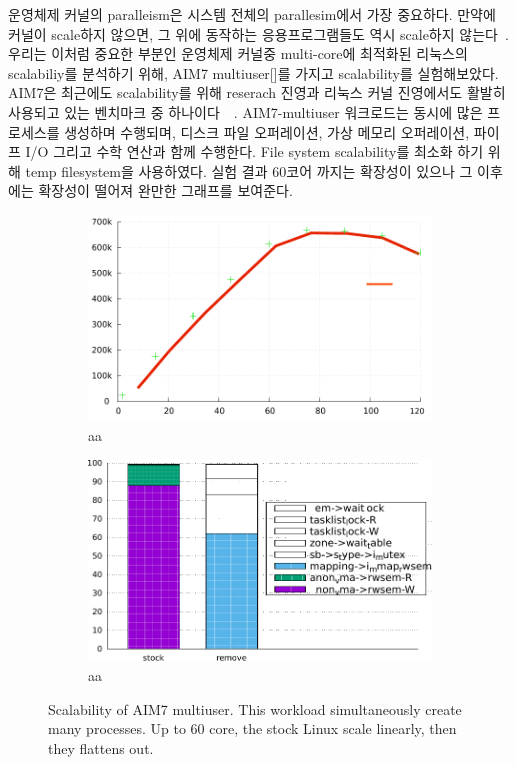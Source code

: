 운영체제 커널의 paralleism은 시스템 전체의 parallesim에서 가장 중요하다. 
만약에 커널이 scale하지 않으면, 그 위에 동작하는 응용프로그램들도 역시 scale하지 않는다~\cite{Clements15SCR}.
우리는 이처럼 중요한 부분인 운영체제 커널중 multi-core에 최적화된 리눅스의 scalabiliy를 분석하기 위해, AIM7
multiuser[]를 가지고 scalability를 실험해보았다.
AIM7은 최근에도 scalability를 위해 reserach 진영과 리눅스 커널 진영에서도 활발히 사용되고 있는 벤치마크 중
하나이다~\cite{Bueso2015STP}~\cite{Bueso2014MCS}.
AIM7-multiuser 워크로드는 동시에 많은 프로세스를 생성하며 수행되며, 디스크 파일 오퍼레이션, 가상 메모리 오퍼레이션, 파이프
I/O 그리고 수학 연산과 함께 수행한다.
File system scalability를 최소화 하기 위해 temp filesystem을
사용하였다.
실험 결과 60코어 까지는 확장성이 있으나 그 이후에는 확장성이 떨어져 완만한 그래프를 보여준다. 

\else

\begin{figure}
  \begin{subfigure}[b]{0.23\textwidth}
    \includegraphics[width=\textwidth]{graph/aim7_default}
    \caption{aa}
  \end{subfigure}%
  \begin{subfigure}[b]{0.25\textwidth}
    \includegraphics[width=\textwidth]{graph/lockstat}
    \caption{aa}
  \end{subfigure}
  \centering
  \caption{Scalability of AIM7 multiuser. This workload simultaneously create
  many processes.
  Up to 60 core, the stock Linux scale linearly, then they flattens out.}
  \label{fig:aim7_default}
\end{figure}


